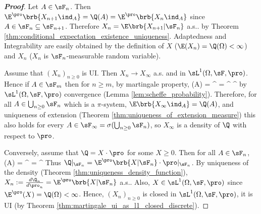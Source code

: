 \begin{proof}[\bf Proof]%

Let $A \in \sF_n$. Then $\E^{\pro}\brb{X_{n+1}\ind_A} = \Q(A) = \E^{\pro}\brb{X_n\ind_A}$ since $A \in \sF_n\subseteq \sF_{n+1}$. Therefore $X_n = \E\brb{X_{n+1}|\sF_n}$ a.s.. by Theorem \ref{thm:conditional_expectation_existence_uniqueness}. Adaptedness and Integrability are easily obtained by the definition of $X$ ($\E(X_n) = \Q(\Omega) < \infty $) and $X_n$ ($X_n$ is $\sF_n$-measurable random variable).



Assume that $(X_n)_{n \geq 0}$ is UI. Then $X_n \to  X_\infty$ a.s. and in $\sL^1(\Omega,\sF,\pro)$. Hence if $A \in \sF_m$ then for $n \geq m$, by martingale property,
\be
\Q(A) = \E^\pro{} = \E^\pro{} \to \E^\pro{}
\ee
by $\sL^1(\Omega,\sF,\pro)$ convergence (Lemma \ref{lem:scheffe_probability}). Therefore, for all $A \in \bigcup_{n\geq0} \sF_n$ which is a $\pi$-system, $\E\brb{X_\infty \ind_A} = \Q(A)$, and uniqueness of extension (Theorem \ref{thm:uniqueness_of_extension_measure}) this also holds for every $A \in \sF_\infty = \sigma(\bigcup_{n\geq0} \sF_n)$, so $X_\infty$ is a density of $\Q$ with respect to $\pro$.

Conversely, assume that $\Q = X \cdot \pro$ for some $X \geq 0$. Then for all $A \in \sF_n$,
\be
\Q(A) = \E^\pro{} = \E^\pro{}
\ee
Thus $\Q|_{\sF_n} = \E^\pro\brb{X | \sF_n} \cdot \pro|_{\sF_n}$. By uniqueness of the density (Theorem \ref{thm:uniqueness_density_function}), $X_n := \frac{d\Q_n}{d\pro_n} = \E^\pro\brb{X |\sF_n}$ a.s.. Also, $X\in \sL^1(\Omega,\sF,\pro)$ since $\E^\pro(X) = \Q(\Omega) < \infty$. Hence, $(X_n)_{n \geq 0}$ is closed in $\sL^1(\Omega,\sF,\pro)$, it is UI (by Theorem \ref{thm:martingale_ui_as_l1_closed_discrete}).
\end{proof}



